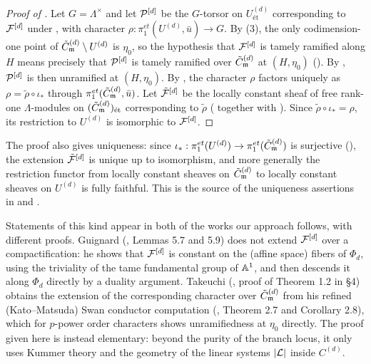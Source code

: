 \begin{proof}[Proof of ]
    Let $G = \Lambda^\times$ and let $\mathcal{P}^{[d]}$ be the $G$-torsor on $U^{(d)}_{\text{\'et}}$
    corresponding to $\mathcal{F}^{[d]}$ under , with character
    $\rho : \pi_1^{et}(U^{(d)}, \bar{u}) \to G$.
    By (3), the only codimension-one point of
    $\tilde{C}_{\mathfrak{m}}^{(d)} \setminus U^{(d)}$ is $\eta_0$, so the hypothesis that $\mathcal{F}^{[d]}$ is tamely ramified
    along $H$ means precisely that $\mathcal{P}^{[d]}$ is tamely ramified over $\tilde{C}_{\mathfrak{m}}^{(d)}$ at $(H, \eta_0)$
    ().
    By , $\mathcal{P}^{[d]}$ is then unramified at
    $(H, \eta_0)$. By , the character $\rho$ factors uniquely as
    $\rho = \tilde{\rho} \circ \iota_*$ through
    $\pi_1^{et}(\tilde{C}_{\mathfrak{m}}^{(d)}, \bar{u})$. Let $\tilde{\mathcal{F}}^{[d]}$ be the locally constant sheaf of free
    rank-one $\Lambda$-modules on $(\tilde{C}_{\mathfrak{m}}^{(d)})_{\text{\'et}}$ corresponding to $\tilde{\rho}$
    ( together with
    ). Since $\tilde{\rho} \circ \iota_* = \rho$, its restriction
    to $U^{(d)}$ is isomorphic to $\mathcal{F}^{[d]}$.
\end{proof}

\begin{rem*}
    The proof also gives uniqueness: since $\iota_* : \pi_1^{et}(U^{(d)}) \to \pi_1^{et}(\tilde{C}_{\mathfrak{m}}^{(d)})$ is
    surjective (), the extension $\tilde{\mathcal{F}}^{[d]}$ is unique up to
    isomorphism, and more generally the restriction functor from locally constant sheaves on $\tilde{C}_{\mathfrak{m}}^{(d)}$
    to locally constant sheaves on $U^{(d)}$ is fully faithful. This is the source of the uniqueness
    assertions in  and .
\end{rem*}

\begin{rem*}
    Statements of this kind appear in both of the works our approach follows, with different proofs.
    Guignard (\cite{Guignard2018}, Lemmas 5.7 and 5.9) does not extend $\mathcal{F}^{[d]}$ over a
    compactification: he shows that $\mathcal{F}^{[d]}$ is constant on the (affine space) fibers of $\Phi_d$,
    using the triviality of the tame fundamental group of $\mathbb{A}^1$, and then descends it along $\Phi_d$
    directly by a duality argument. Takeuchi (\cite{takeuchi2019blow}, proof of Theorem 1.2 in \S 4)
    obtains the extension of the corresponding character over $\tilde{C}_{\mathfrak{m}}^{(d)}$ from his refined
    (Kato--Matsuda) Swan conductor computation (\cite{takeuchi2019blow}, Theorem 2.7 and Corollary 2.8),
    which for $p$-power order characters shows unramifiedness at $\eta_0$ directly.
    The proof given here is instead elementary: beyond the purity of the branch locus, it only uses
    Kummer theory and the geometry of the linear systems $|\mathcal{L}|$ inside $C^{(d)}$.
\end{rem*}
